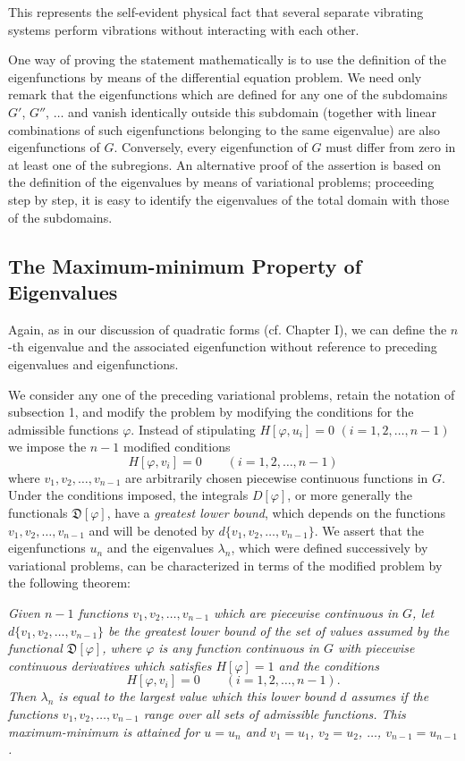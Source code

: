 This represents the self-evident physical fact that several separate vibrating systems perform vibrations without interacting with each other.

One way of proving the statement mathematically is to use the definition of the eigenfunctions by means of the differential equation problem. We need only remark that the eigenfunctions which are defined for any one of the subdomains $G'$, $G''$, $\ldots$ and vanish identically outside this subdomain (together with linear combinations of such eigenfunctions belonging to the same eigenvalue) are also eigenfunctions of $G$. Conversely, every eigenfunction of $G$ must differ from zero in at least one of the subregions. An alternative proof of the assertion is based on the definition of the eigenvalues by means of variational problems; proceeding step by step, it is easy to identify the eigenvalues of the total domain with those of the subdomains.

\subsection{The Maximum-minimum Property of Eigenvalues}
Again, as in our discussion of quadratic forms (cf. Chapter I), we can define the $n$-th eigenvalue and the associated eigenfunction without reference to preceding eigenvalues and eigenfunctions.

We consider any one of the preceding variational problems, retain the notation of subsection 1, and modify the problem by modifying the conditions for the admissible functions $\varphi$. Instead of stipulating $H[\varphi,u_i]=0$ $(i=1,2,\ldots,n-1)$ we impose the $n-1$ modified conditions
\[
H[\varphi,v_i]=0\qquad(i=1,2,\ldots,n-1)
\]
where $v_1,v_2,\ldots,v_{n-1}$ are arbitrarily chosen piecewise continuous functions in $G$. Under the conditions imposed, the integrals $D[\varphi]$, or more generally the functionals $\mathfrak D[\varphi]$, have a \emph{greatest lower bound}, which depends on the functions $v_1,v_2,\ldots,v_{n-1}$ and will be denoted by $d\{v_1,\allowbreak v_2,\allowbreak\ldots,\allowbreak v_{n-1}\}$. We assert that the eigenfunctions $u_n$ and the eigenvalues $\lambda_n$, which were defined successively by variational problems, can be characterized in terms of the modified problem by the following theorem:

\emph{Given $n-1$ functions $v_1,v_2,\ldots,v_{n-1}$ which are piecewise continuous in $G$, let $d\{v_1,\allowbreak v_2,\allowbreak\ldots,\allowbreak v_{n-1}\}$ be the greatest lower bound of the set of values assumed by the functional $\mathfrak D[\varphi]$, where $\varphi$ is any function continuous in $G$ with piecewise continuous derivatives which satisfies $H[\varphi]=1$ and the conditions}
\begin{equation}\tag{17}
H[\varphi,v_i]=0\qquad(i=1,2,\ldots,n-1).
\end{equation}
\emph{Then $\lambda_n$ is equal to the largest value which this lower bound $d$ assumes if the functions $v_1,v_2,\ldots,v_{n-1}$ range over all sets of admissible functions. This maximum-minimum is attained for $u=u_n$ and $v_1=u_1$, $v_2=u_2$, $\ldots$, $v_{n-1}=u_{n-1}$.}

